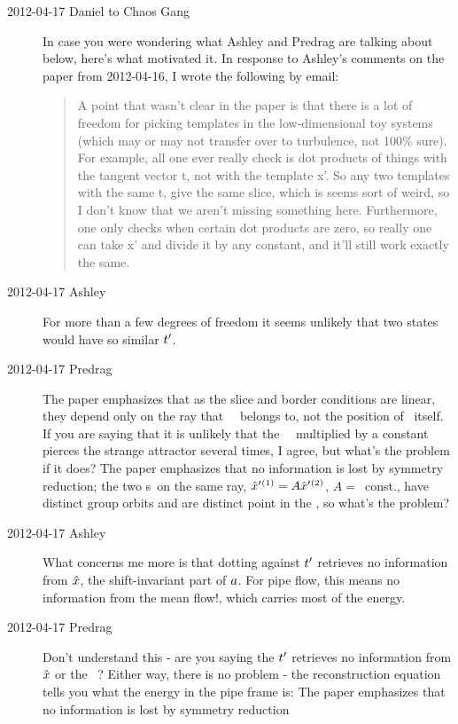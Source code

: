 \begin{description}
\item[2012-04-17 Daniel to Chaos Gang] In case you were wondering what
Ashley and Predrag are talking about below, here's what motivated it. In
response to Ashley's comments on the paper from 2012-04-16, I wrote the
following by email:

\begin{quotation}
A point that wasn't clear in the paper is that there is
a lot of freedom for picking templates in the low-dimensional toy systems
(which may or may not transfer over to turbulence, not 100\% sure). For
example, all one ever really check is dot products of things with the
tangent vector t, not with the template x'. So any two templates with the
same t, give the same slice, which is seems sort of weird, so I don't
know that we aren't missing something here. Furthermore, one only checks
when certain dot products are zero, so really one can take x' and divide
it by any constant, and it'll still work exactly the same.
\end{quotation}

\item[2012-04-17 Ashley]
For more than a few degrees of freedom it seems unlikely that two states
would have so similar $t'_{}$.

\item[2012-04-17 Predrag]
The paper emphasizes that as the slice and border conditions
are linear, they depend only on the ray that \template\ \slicep\ belongs
to, not the position of \slicep\ itself. If you are saying that it is
unlikely that the \template\ \slicep\ multiplied by a constant pierces
the strange attractor several times, I agree, but what's the problem if it
does? The paper emphasizes that no information is lost by
symmetry reduction; the two \template s\ on the same ray,
${\hat{x}'}{}^{(1)} = A {\hat{x}'}{}^{(2)}  $, $A=$~const., have distinct group
orbits and are distinct point in the \slice, so what's the problem?

\item[2012-04-17 Ashley]
What concerns me more is that
dotting against $t'_{}$ retrieves no information from $\hat{x}$,
the shift-invariant part of $a$.  For pipe flow, this means no
information from the mean flow!, which carries most of the energy.

\item[2012-04-17 Predrag] Don't understand this - are you saying the
$t'_{}$ retrieves no information from $\hat{x}$ or the \template\
\slicep? Either way, there is no problem - the reconstruction equation
tells you what the energy in the pipe frame is: The paper\rf{atlas12}
emphasizes that no information is lost by symmetry reduction


\end{description}
